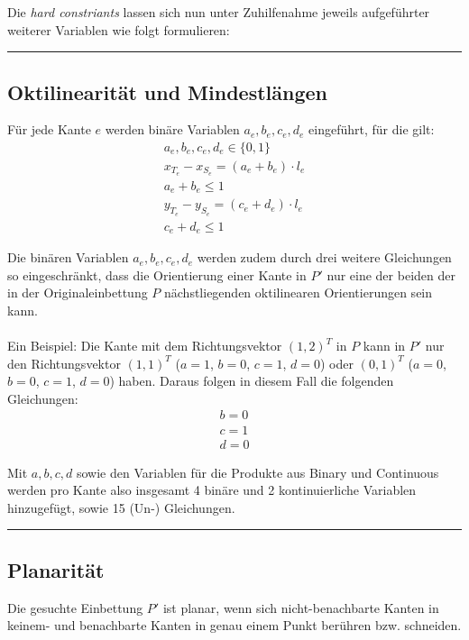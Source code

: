 \documentclass[a4paper,11pt]{amsart}
\begin{document}
\noindent Die \textit{hard constriants} lassen sich nun unter Zuhilfenahme jeweils aufgeführter weiterer Variablen wie folgt formulieren:
\bigskip
\hrule

\subsection*{Oktilinearität und Mindestlängen}
Für jede Kante $e$ werden binäre Variablen $a_e, b_e, c_e, d_e$ eingeführt, für die gilt:
\bigskip
\begin{gather*}
a_e, b_e, c_e, d_e \in \{0, 1\}\\
x_{T_e} - x_{S_e} = (a_e + b_e) \cdot l_e\\
a_e + b_e \le 1\\
y_{T_e} - y_{S_e} = (c_e + d_e) \cdot l_e\\
c_e + d_e \le 1
\end{gather*}

\bigskip

\noindent Die binären Variablen $a_e, b_e, c_e, d_e$ werden zudem durch drei weitere Gleichungen so eingeschränkt, dass die Orientierung einer Kante in $P'$ nur eine der beiden der in der Originaleinbettung $P$ nächstliegenden oktilinearen Orientierungen sein kann.\\\\
Ein Beispiel: Die Kante mit dem Richtungsvektor $(1, 2)^T$ in $P$ kann in $P'$ nur den Richtungsvektor $(1, 1)^T$ ($a = 1$, $b = 0$, $c = 1$, $d = 0$) oder $(0, 1)^T$ ($a = 0$, $b = 0$, $c = 1$, $d = 0$) haben. Daraus folgen in diesem Fall die folgenden Gleichungen:
\bigskip
\begin{gather*}
b = 0\\
c = 1\\
d = 0
\end{gather*}

\bigskip
\noindent Mit $a, b, c, d$ sowie den Variablen für die Produkte aus Binary und Continuous werden pro Kante also insgesamt 4 binäre und 2 kontinuierliche Variablen hinzugefügt, sowie 15 (Un-) Gleichungen.
\bigskip
\hrule

\subsection*{Planarität}

Die gesuchte Einbettung $P'$ ist planar, wenn sich nicht-benachbarte Kanten in keinem- und benachbarte Kanten in genau einem Punkt berühren bzw. schneiden.
\end{document}

